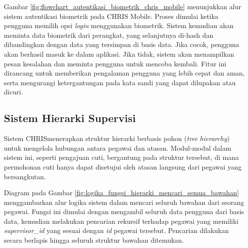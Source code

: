 Gambar \ref{fig:flowchart_autentikasi_biometrik_chris_mobile} menunjukkan alur sistem autentikasi biometrik pada CHRIS Mobile. Proses dimulai ketika pengguna memilih opsi \textit{login} menggunakan biometrik. Sistem kemudian akan meminta data biometrik dari perangkat, yang selanjutnya di-hash dan dibandingkan dengan data yang tersimpan di basis data. Jika cocok, pengguna akan berhasil masuk ke dalam aplikasi. Jika tidak, sistem akan menampilkan pesan kesalahan dan meminta pengguna untuk mencoba kembali. Fitur ini dirancang untuk memberikan pengalaman pengguna yang lebih cepat dan aman, serta mengurangi ketergantungan pada kata sandi yang dapat dilupakan atau dicuri.



\subsection{Sistem Hierarki Supervisi}
Sistem CHRIS\@ menerapkan struktur hierarki berbasis pohon (\textit{tree hierarchy}) untuk mengelola hubungan antara pegawai dan atasan. Modul-modul dalam sistem ini, seperti pengajuan cuti, bergantung pada struktur tersebut, di mana permohonan cuti hanya dapat disetujui oleh atasan langsung dari pegawai yang bersangkutan.

Diagram pada Gambar \ref{fig:logika_fungsi_hierarki_mencari_semua_bawahan} menggambarkan alur logika sistem dalam mencari seluruh bawahan dari seorang pegawai. Fungsi ini dimulai dengan mengambil seluruh data pengguna dari basis data, kemudian melakukan pencarian rekursif terhadap pegawai yang memiliki \textit{supervisor\_id} yang sesuai dengan \textit{id} pegawai tersebut. Pencarian dilakukan secara berlapis hingga seluruh struktur bawahan ditemukan.

